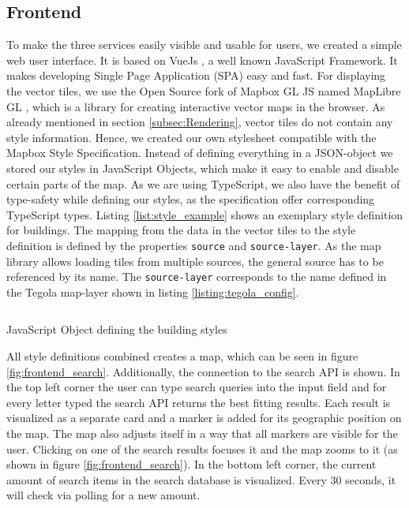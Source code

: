 \documentclass[conference]{IEEEtran}
\begin{document}
\subsection{Frontend}
\label{subsec:Frontend}
To make the three services easily visible and usable for users, we created a simple web user interface. It is based on VueJs \cite{noauthor_vuejs_nodate}, a well known JavaScript Framework. It makes developing Single Page Application (SPA) easy and fast. For displaying the vector tiles, we use the Open Source fork of Mapbox GL JS named MapLibre GL \cite{noauthor_maplibre_2022}, which is a library for creating interactive vector maps in the browser. As already mentioned in section \ref{subsec:Rendering}, vector tiles do not contain any style information. Hence, we created our own stylesheet compatible with the Mapbox Style Specification. Instead of defining everything in a JSON-object we stored our styles in JavaScript Objects, which make it easy to enable and disable certain parts of the map. As we are using TypeScript, we also have the benefit of type-safety while defining our styles, as the specification offer corresponding TypeScript types. Listing \ref{list:style_example} shows an exemplary style definition for buildings. The mapping from the data in the vector tiles to the style definition is defined by the properties \texttt{source} and \texttt{source-layer}. As the map library allows loading tiles from multiple sources, the general source has to be referenced by its name. The \texttt{source-layer} corresponds to the name defined in the Tegola map-layer shown in listing \ref{listing:tegola_config}.
\begin{listing}
    \inputminted{ts}{listings/style_building.ts}
    \caption{JavaScript Object defining the building styles}
    \label{list:style_example}
\end{listing}
All style definitions combined creates a map, which can be seen in figure \ref{fig:frontend_search}. Additionally, the connection to the search API is shown. In the top left corner the user can type search queries into the input field and for every letter typed the search API returns the best fitting results. Each result is visualized as a separate card and a marker is added for its geographic position on the map. The map also adjusts itself in a way that all markers are visible for the user. Clicking on one of the search results focuses it and the map zooms to it (as shown in figure \ref{fig:frontend_search}). In the bottom left corner, the current amount of search items in the search database is visualized. Every 30 seconds, it will check via polling for a new amount. 
\end{document}
